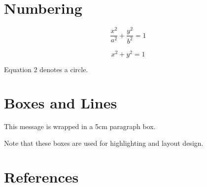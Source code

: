 \documentclass[12pt,a4paper]{article}
\begin{document}
	\section{Numbering}
	
	\begin{equation}
		\frac{x^2}{a^2}+\frac{y^2}{b^2}=1
	\end{equation}
	
	\begin{equation}
		x^2+y^2=1
	\end{equation}
	
	Equation 2 denotes a circle.
	
	
	
	\section{Boxes and Lines}
	
	
	
	
	\usebox{\boxone}
	
	\vspace{0.3cm}
	
	\usebox{\boxtwo}
	
	\vspace{0.3cm}
	
	\usebox{\boxthree}
	
	\vspace{0.5cm}
	
	\parbox{5cm}{
		This message is wrapped in a 5cm paragraph box.
	}
	
	\vspace{0.5cm}
	
	Note that these boxes are used for highlighting and layout design.
	
	
	
	\newpage
	
	\section*{References}
	
	
	
	
	
	\newpage
	
	\printindex
	
\end{document}
